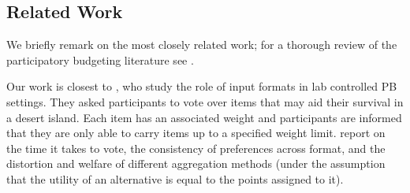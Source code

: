 \documentclass[letterpaper]{article} %
\begin{document}
\subsection{Related Work}\label{sec:related}
We briefly remark on the most closely related work; for a thorough review of the participatory budgeting literature see \citet{aziz2021participatory}.

Our work is closest to  \citet{benade2018efficiency}, who study the role of input formats in lab controlled PB settings. They asked participants  to vote over items that may aid their survival in a desert island. Each item has an associated weight and participants are informed that they are only able to carry items up to a specified weight limit. %
\citet{benade2018efficiency} report on the time it takes to vote, the consistency of preferences across format, and the distortion and welfare of different aggregation methods (under the assumption that the utility of an alternative is equal to the points assigned to it). %
\end{document}
